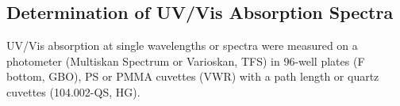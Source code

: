 \subsection{Determination of UV/Vis Absorption Spectra}
UV/Vis absorption at single wavelengths or spectra were measured on a photometer (Multiskan Spectrum or Varioskan, TFS) in 96-well plates (F bottom, GBO), PS or PMMA cuvettes (VWR) with a path length  or quartz cuvettes (104.002-QS, HG).

